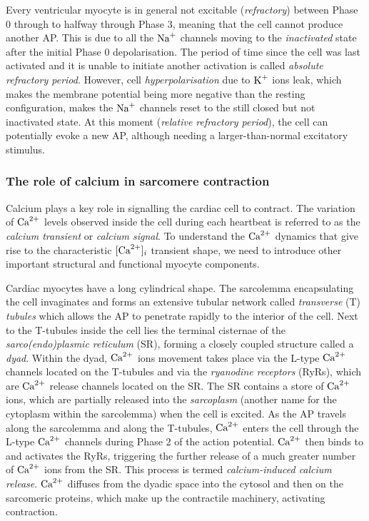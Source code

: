 \vspace{0.2cm}
Every ventricular myocyte is in general not excitable (\textit{refractory}) between Phase $0$ through to halfway through Phase $3$, meaning that the cell cannot produce another AP. This is due to all the $\textrm{Na}^{+}$ channels moving to the \textit{inactivated} state after the initial Phase $0$ depolarisation. The period of time since the cell was last activated and it is unable to initiate another activation is called \textit{absolute refractory period}. However, cell \textit{hyperpolarisation} due to $\textrm{K}^{+}$ ions leak, which makes the membrane potential being more negative than the resting configuration, makes the $\textrm{Na}^{+}$ channels reset to the still closed but not inactivated state. At this moment (\textit{relative refractory period}), the cell can potentially evoke a new AP, although needing a larger-than-normal excitatory stimulus.


%
%
%
\subsubsection{The role of calcium in sarcomere contraction}\label{ch1:the_role_of_calcium_in_sarcomere_contraction}
Calcium plays a key role in signalling the cardiac cell to contract. The variation of $\textrm{Ca}^{2+}$ levels observed inside the cell during each heartbeat is referred to as the \textit{calcium transient} or \textit{calcium signal}. To understand the $\textrm{Ca}^{2+}$ dynamics that give rise to the characteristic $[\textrm{Ca}^{2+}]_{i}$ transient shape, we need to introduce other important structural and functional myocyte components.

\vspace{0.2cm}
Cardiac myocytes have a long cylindrical shape. The sarcolemma encapsulating the cell invaginates and forms an extensive tubular network called \textit{transverse} (\acs{T}) \textit{tubules} which allows the AP to penetrate rapidly to the interior of the cell. Next to the T-tubules inside the cell lies the terminal cisternae of the \textit{sarco(endo)plasmic reticulum} (\acs{SR}), forming a closely coupled structure called a \textit{dyad}. Within the dyad, $\textrm{Ca}^{2+}$ ions movement takes place via the L-type $\textrm{Ca}^{2+}$ channels located on the T-tubules and via the \textit{ryanodine receptors} (\acs{RyR}s), which are $\textrm{Ca}^{2+}$ release channels located on the SR. The SR contains a store of $\textrm{Ca}^{2+}$ ions, which are partially released into the \textit{sarcoplasm} (another name for the cytoplasm within the sarcolemma) when the cell is excited. As the AP travels along the sarcolemma and along the T-tubules, $\textrm{Ca}^{2+}$ enters the cell through the L-type $\textrm{Ca}^{2+}$ channels during Phase $2$ of the action potential. $\textrm{Ca}^{2+}$ then binds to and activates the RyRs, triggering the further release of a much greater number of $\textrm{Ca}^{2+}$ ions from the SR. This process is termed \textit{calcium-induced calcium release}. $\textrm{Ca}^{2+}$ diffuses from the dyadic space into the cytosol and then on the sarcomeric proteins, which make up the contractile machinery, activating contraction.

